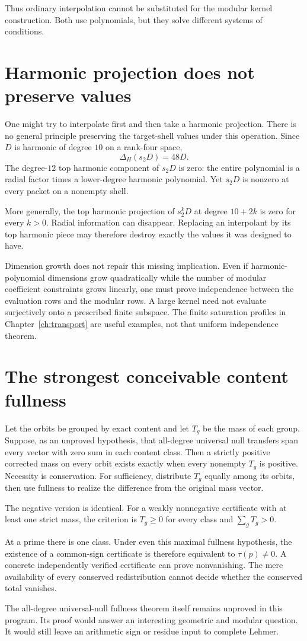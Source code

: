 Thus ordinary interpolation cannot be substituted for the modular kernel construction. Both use polynomials, but they solve different systems of conditions.

\section{Harmonic projection does not preserve values}
One might try to interpolate first and then take a harmonic projection. There is no general principle preserving the target-shell values under this operation. Since $D$ is harmonic of degree $10$ on a rank-four space,
\[
\Delta_H(s_2D)=48D.
\]
The degree-$12$ top harmonic component of $s_2D$ is zero: the entire polynomial is a radial factor times a lower-degree harmonic polynomial. Yet $s_2D$ is nonzero at every packet on a nonempty shell.

More generally, the top harmonic projection of $s_2^kD$ at degree $10+2k$ is zero for every $k>0$. Radial information can disappear. Replacing an interpolant by its top harmonic piece may therefore destroy exactly the values it was designed to have.

Dimension growth does not repair this missing implication. Even if harmonic-polynomial dimensions grow quadratically while the number of modular coefficient constraints grows linearly, one must prove independence between the evaluation rows and the modular rows. A large kernel need not evaluate surjectively onto a prescribed finite subspace. The finite saturation profiles in Chapter~\ref{ch:transport} are useful examples, not that uniform independence theorem.

\section{The strongest conceivable content fullness}
Let the orbits be grouped by exact content and let $T_g$ be the mass of each group. Suppose, as an unproved hypothesis, that all-degree universal null transfers span every vector with zero sum in each content class. Then a strictly positive corrected mass on every orbit exists exactly when every nonempty $T_g$ is positive. Necessity is conservation. For sufficiency, distribute $T_g$ equally among its orbits, then use fullness to realize the difference from the original mass vector.

The negative version is identical. For a weakly nonnegative certificate with at least one strict mass, the criterion is $T_g\ge0$ for every class and $\sum_gT_g>0$.

At a prime there is one class. Under even this maximal fullness hypothesis, the existence of a common-sign certificate is therefore equivalent to $\tau(p)\ne0$. A concrete independently verified certificate can prove nonvanishing. The mere availability of every conserved redistribution cannot decide whether the conserved total vanishes.

The all-degree universal-null fullness theorem itself remains unproved in this program. Its proof would answer an interesting geometric and modular question. It would still leave an arithmetic sign or residue input to complete Lehmer.
